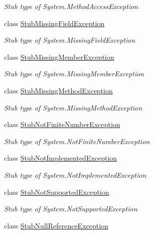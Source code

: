 \begin{DoxyCompactItemize}
\begin{DoxyCompactList}\small\item\em Stub type of System.\-Method\-Access\-Exception\end{DoxyCompactList}\item 
class \hyperlink{class_system_1_1_fakes_1_1_stub_missing_field_exception}{Stub\-Missing\-Field\-Exception}
\begin{DoxyCompactList}\small\item\em Stub type of System.\-Missing\-Field\-Exception\end{DoxyCompactList}\item 
class \hyperlink{class_system_1_1_fakes_1_1_stub_missing_member_exception}{Stub\-Missing\-Member\-Exception}
\begin{DoxyCompactList}\small\item\em Stub type of System.\-Missing\-Member\-Exception\end{DoxyCompactList}\item 
class \hyperlink{class_system_1_1_fakes_1_1_stub_missing_method_exception}{Stub\-Missing\-Method\-Exception}
\begin{DoxyCompactList}\small\item\em Stub type of System.\-Missing\-Method\-Exception\end{DoxyCompactList}\item 
class \hyperlink{class_system_1_1_fakes_1_1_stub_not_finite_number_exception}{Stub\-Not\-Finite\-Number\-Exception}
\begin{DoxyCompactList}\small\item\em Stub type of System.\-Not\-Finite\-Number\-Exception\end{DoxyCompactList}\item 
class \hyperlink{class_system_1_1_fakes_1_1_stub_not_implemented_exception}{Stub\-Not\-Implemented\-Exception}
\begin{DoxyCompactList}\small\item\em Stub type of System.\-Not\-Implemented\-Exception\end{DoxyCompactList}\item 
class \hyperlink{class_system_1_1_fakes_1_1_stub_not_supported_exception}{Stub\-Not\-Supported\-Exception}
\begin{DoxyCompactList}\small\item\em Stub type of System.\-Not\-Supported\-Exception\end{DoxyCompactList}\item 
class \hyperlink{class_system_1_1_fakes_1_1_stub_null_reference_exception}{Stub\-Null\-Reference\-Exception}

\end{DoxyCompactItemize}
